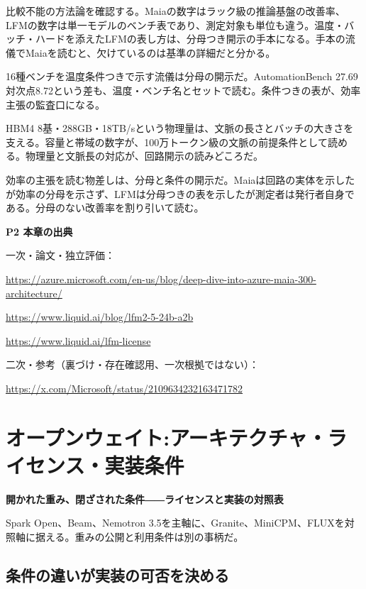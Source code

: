 \documentclass[lualatex,a4paper,10pt]{jlreq}
\begin{document}
比較不能の方法論を確認する。Maiaの数字はラック級の推論基盤の改善率、LFMの数字は単一モデルのベンチ表であり、測定対象も単位も違う。温度・バッチ・ハードを添えたLFMの表し方は、分母つき開示の手本になる。手本の流儀でMaiaを読むと、欠けているのは基準の詳細だと分かる。
\cite{B09,B11,B12,B10}


16種ベンチを温度条件つきで示す流儀は分母の開示だ。AutomationBench 27.69対次点8.72という差も、温度・ベンチ名とセットで読む。条件つきの表が、効率主張の監査口になる。
\cite{B11,B12}


HBM4 8基・288GB・18TB/sという物理量は、文脈の長さとバッチの大きさを支える。容量と帯域の数字が、100万トークン級の文脈の前提条件として読める。物理量と文脈長の対応が、回路開示の読みどころだ。
\cite{B09,B10}


効率の主張を読む物差しは、分母と条件の開示だ。Maiaは回路の実体を示したが効率の分母を示さず、LFMは分母つきの表を示したが測定者は発行者自身である。分母のない改善率を割り引いて読む。
\cite{B09,B11,B12,B10}


\begin{tcolorbox}[colback=white,colframe=SurveyRule,arc=1mm,boxrule=0.4pt,left=2mm,right=2mm]
\textbf{P2 本章の出典}\par\footnotesize
一次・論文・独立評価：\par
[B09] \url{https://azure.microsoft.com/en-us/blog/deep-dive-into-azure-maia-300-architecture/}\par
[B11] \url{https://www.liquid.ai/blog/lfm2-5-24b-a2b}\par
[B12] \url{https://www.liquid.ai/lfm-license}\par
二次・参考（裏づけ・存在確認用、一次根拠ではない）：\par
[B10] \url{https://x.com/Microsoft/status/2109634232163471782}\par
\end{tcolorbox}

\section{オープンウェイト:アーキテクチャ・ライセンス・実装条件}
\label{sec:P3}

{\Large\bfseries 開かれた重み、閉ざされた条件――ライセンスと実装の対照表\par}
\smallskip
{\color{SurveyMuted}Spark Open、Beam、Nemotron 3.5を主軸に、Granite、MiniCPM、FLUXを対照軸に据える。重みの公開と利用条件は別の事柄だ。\par}
\bigskip

\subsection*{条件の違いが実装の可否を決める}
\end{document}
